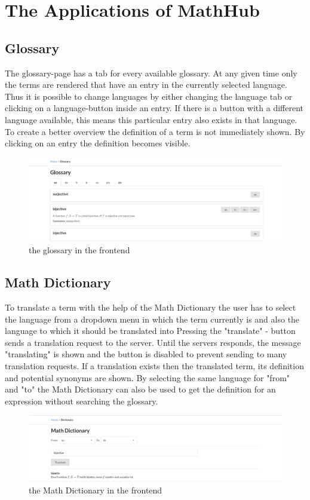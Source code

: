 \documentclass[11pt,a4paper]{article}
\begin{document}
\section{The Applications of MathHub}

\subsection{Glossary}
The glossary-page has a tab for every available glossary.
At any given time only the terms are rendered that have an entry in the currently selected language.
Thus it is possible to change languages by either changing the language tab or clicking on a language-button inside an entry.
If there is a button with a different language available, this means this particular entry also exists in that language.
To create a better overview the definition of a term is not immediately shown.
By clicking on an entry the definition becomes visible. 
\begin{figure}[H]
\includegraphics[width=1\textwidth]{glossary.png}
\caption{the glossary in the frontend}
\end{figure}

\subsection{Math Dictionary}
To translate a term with the help of the Math Dictionary the user has to select the language from a dropdown menu in which the term currently is and also the language to which it should be translated into
Pressing the "translate" - button sends a translation request to the server.
Until the servers responds, the message "translating" is shown and the button is disabled to prevent sending to many translation requests.
If a translation exists then the translated term, its definition and potential synonyms are shown.
By selecting the same language for "from" and "to" the Math Dictionary can also be used to get the definition for an expression without searching the glossary. 
\begin{figure}[H]
\includegraphics[width=1\textwidth]{dictionary.png}
\caption{the Math Dictionary in the frontend}
\end{figure}
\end{document}
